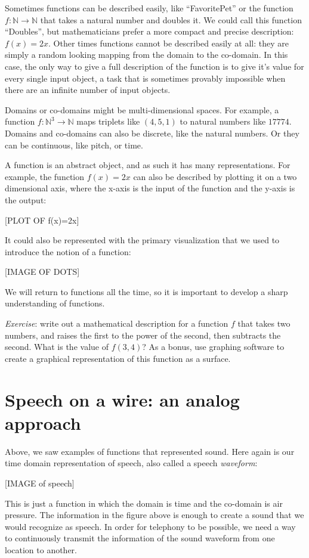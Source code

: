 \documentclass[UTF8]{book}
\begin{document}
\begin{CJK}{UTF8}{gbsn}
Sometimes functions can be described easily, like ``FavoritePet'' or the function $f: \mathbb{N} \rightarrow \mathbb{N}$ that takes a natural number and doubles it. We could call this function ``Doubles'', but mathematicians prefer a more compact and precise description: $f(x) = 2x$. Other times functions cannot be described easily at all: they are simply a random looking mapping from the domain to the co-domain. In this case, the only way to give a full description of the function is to give it's value for every single input object, a task that is sometimes provably impossible when there are an infinite number of input objects.

Domains or co-domains might be multi-dimensional spaces. For example, a function $f: \mathbb{N}^{3} \rightarrow \mathbb{N}$ maps triplets like $(4,5,1)$ to natural numbers like $17774$. Domains and co-domains can also be discrete, like the natural numbers. Or they can be continuous, like pitch, or time.

A function is an abstract object, and as such it has many representations. For example, the function $f(x)=2x$ can also be described by plotting it on a two dimensional axis, where the x-axis is the input of the function and the y-axis is the output:

[PLOT OF f(x)=2x]

It could also be represented with the primary visualization that we used to introduce the notion of a function:

[IMAGE OF DOTS]

We will return to functions all the time, so it is important to develop a sharp understanding of functions.

\emph{Exercise}: write out a mathematical description for a function $f$ that takes two numbers, and raises the first to the power of the second, then subtracts the second. What is the value of $f(3,4)$? As a bonus, use graphing software to create a graphical representation of this function as a surface.

\section{Speech on a wire: an analog approach}

Above, we saw examples of functions that represented sound. Here again is our time domain representation of speech, also called a speech \emph{waveform}:

[IMAGE of speech]

This is just a function in which the domain is time and the co-domain is air pressure. The information in the figure above is enough to create a sound that we would recognize as speech. In order for telephony to be possible, we need a way to continuously transmit the information of the sound waveform from one location to another.


\end{CJK}
\end{document}
